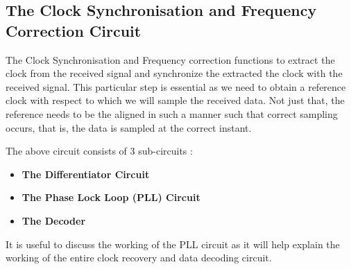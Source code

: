 \documentclass{article}
\begin{document}

\subsection{The Clock Synchronisation and Frequency Correction Circuit}
The Clock Synchronisation and Frequency correction functions to extract the clock from the received signal and synchronize the extracted the clock with the received signal. This particular step is essential as we need to obtain a reference clock with respect to which  we will sample the received data. Not just that, the reference needs to be the aligned in such a manner such that correct sampling occurs, that is, the data is sampled at the correct instant.

The above circuit consists of 3 sub-circuits :
\begin{itemize}
\item \textbf{The Differentiator Circuit}
\item \textbf{The Phase Lock Loop (PLL) Circuit}
\item \textbf{The Decoder}
\end{itemize}
It is useful to discuss the working of the PLL circuit as it will help explain the working of the entire clock recovery and data decoding circuit.
\end{document}
